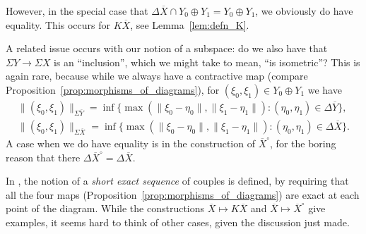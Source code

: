 \documentclass[a4paper,11pt]{article}
\theoremstyle{plain}
\theoremstyle{remark}
\newenvironment{remark}
  {\pushQED{\qed}\renewcommand{\qedsymbol}{$\triangle$}\remarkx}
  {\popQED\endremarkx}
\begin{document}
\begin{remark}
However, in the special case that $\Delta\overline X \cap Y_0\oplus Y_1 = Y_0 \oplus Y_1$, we obviously do have equality.  This occurs for $K\overline X$, see Lemma~\ref{lem:defn_K}.
\end{remark}

A related issue occurs with our notion of a subspace: do we also have that $\Sigma Y \to \Sigma X$ is an ``inclusion'', which we might take to mean, ``is isometric''?  This is again rare, because while we always have a contractive map (compare Proposition~\ref{prop:morphisms_of_diagrams}), for $(\xi_0,\xi_1) \in Y_0\oplus Y_1$ we have
\begin{gather*}
\|(\xi_0,\xi_1)\|_{\Sigma\overline Y}
= \inf\big\{\max(\|\xi_0-\eta_0\|, \|\xi_1-\eta_1\|) : (\eta_0,\eta_1)\in \Delta\overline Y\big\}, \\
\|(\xi_0,\xi_1)\|_{\Sigma\overline X}
= \inf\big\{\max(\|\xi_0-\eta_0\|, \|\xi_1-\eta_1\|) : (\eta_0,\eta_1)\in \Delta\overline X\big\}.
\end{gather*}
A case when we do have equality is in the construction of $\overline X^\circ$, for the boring reason that there $\Delta\overline X^\circ = \Delta\overline X$.

In \cite[Section~I.2]{KP_InterpolationFunctorsDuality}, the notion of a \emph{short exact sequence} of couples is defined, by requiring that all the four maps (Proposition~\ref{prop:morphisms_of_diagrams}) are exact at each point of the diagram.  While the constructions $\overline X\mapsto K\overline X$ and $\overline X \mapsto \overline X^\circ$ give examples, it seems hard to think of other cases, given the discussion just made.



\end{document}
